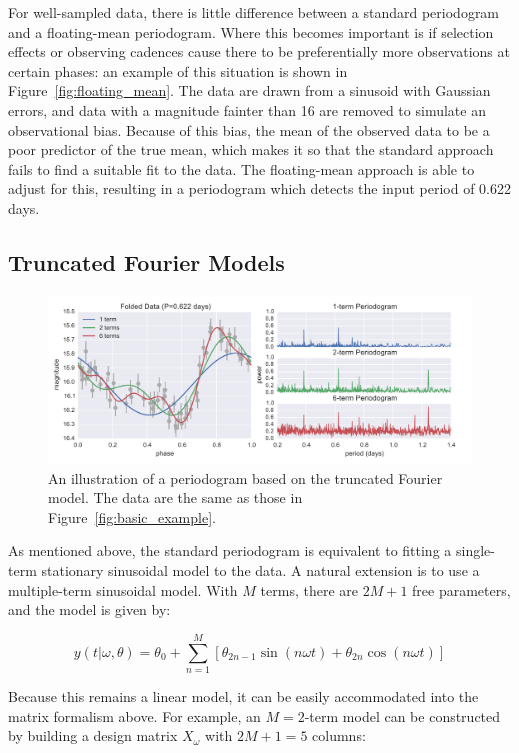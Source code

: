 \documentclass[12pt,preprint]{aastex}
\newcommand{\Fig}[1]{Figure~\ref{fig:#1}}
\newcommand{\fig}[1]{\Fig{#1}}
\newcommand{\figlabel}[1]{\label{fig:#1}}
\newcommand{\sectlabel}[1]{\label{sect:#1}}
\begin{document}
For well-sampled data, there is little difference between a standard periodogram and a floating-mean periodogram. Where this becomes important is if selection effects or observing cadences cause there to be preferentially more observations at certain phases: an example of this situation is shown in \fig{floating_mean}. The data are drawn from a sinusoid with Gaussian errors, and data with a magnitude fainter than 16 are removed to simulate an observational bias. Because of this bias, the mean of the observed data to be a poor predictor of the true mean, which makes it so that the standard approach fails to find a suitable fit to the data. The floating-mean approach is able to adjust for this, resulting in a periodogram which detects the input period of 0.622 days.

\subsection{Truncated Fourier Models}
\sectlabel{multiterm}

\begin{figure}
  \centering
  \includegraphics[width=\textwidth]{fig03.pdf}
  \caption{
    An illustration of a periodogram based on the truncated Fourier model. The data are the same as those in \fig{basic_example}. 
  }
  \figlabel{multiterm_example}
\end{figure}

As mentioned above, the standard periodogram is equivalent to fitting a single-term stationary sinusoidal model to the data. A natural extension is to use a multiple-term sinusoidal model. With $M$ terms, there are $2M + 1$ free parameters, and the model is given by:

\begin{equation}
  y(t|\omega,\theta) = \theta_0 + \sum_{n=1}^M \left[\theta_{2n - 1}\sin(n\omega t) + \theta_{2n}\cos(n\omega t)\right]
\end{equation}

Because this remains a linear model, it can be easily accommodated into the matrix formalism above. For example, an $M = 2$-term model can be constructed by building a design matrix $X_\omega$ with $2M + 1 = 5$ columns:
\end{document}
